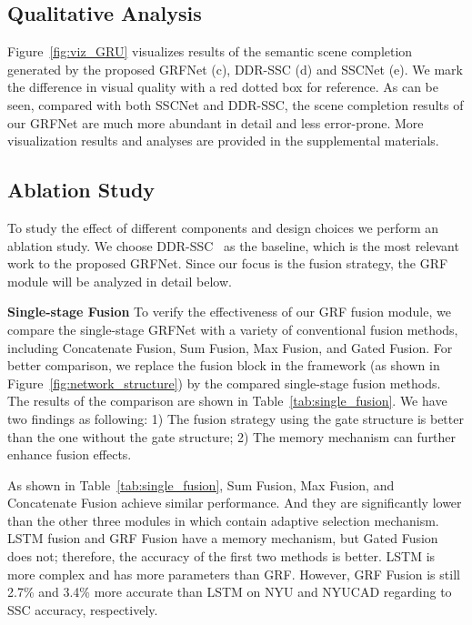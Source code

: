 \documentclass[10pt,twocolumn,letterpaper]{article}
\begin{document}
\subsection{Qualitative Analysis}
\label{sec:QualitativeAnalysis}
\vspace{-0.1cm}
Figure~\ref{fig:viz_GRU} visualizes results of the semantic scene completion generated by the proposed GRFNet (c), DDR-SSC (d) and SSCNet (e). We mark the difference in visual quality with a red dotted box for reference.
As can be seen, compared with both SSCNet and DDR-SSC, the scene completion results of our GRFNet are much more abundant in detail and less error-prone. More visualization results and analyses are provided in the supplemental materials.




\subsection{Ablation Study}
\vspace{-0.1cm}
To study the effect of different components and design choices we perform an ablation study. We choose DDR-SSC~\cite{li2019rgbd}
as the baseline, which is the most relevant work to the proposed GRFNet. Since our focus is the fusion strategy, the GRF module will be analyzed in detail below.

\noindent
\textbf{Single-stage Fusion}
To verify the effectiveness of our GRF fusion module, we compare the single-stage GRFNet with a variety of conventional fusion methods, including Concatenate Fusion, Sum Fusion, Max Fusion, and Gated Fusion. 
For better comparison,
we replace the fusion block in the framework (as shown in Figure~\ref{fig:network_structure}) by the compared single-stage fusion methods. The results of the comparison are shown in Table~\ref{tab:single_fusion}.
We have two findings as following: 1) The fusion strategy using the gate structure is better than the one without the gate structure; 2) The memory mechanism can further enhance fusion effects.

As shown in Table~\ref{tab:single_fusion}, Sum Fusion, Max Fusion, and Concatenate Fusion achieve similar performance.
And they are significantly lower than the other three modules in which contain adaptive selection mechanism. LSTM fusion and GRF Fusion have a memory mechanism, but Gated Fusion does not; therefore, the accuracy of the first two methods is better. LSTM is more complex and has more parameters than GRF. However, GRF Fusion is still 2.7\% and 3.4\% more accurate than LSTM on NYU and NYUCAD regarding to SSC accuracy, respectively.
\end{document}
